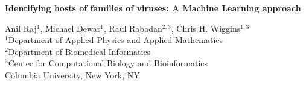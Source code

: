 \documentclass[11pt,amsmath,amstex]{article}
\begin{document}
\begin{center}
\pagestyle{empty}
\textbf{Identifying hosts of families of viruses: A Machine Learning approach}

\small{
Anil Raj$^{1}$, Michael Dewar$^{1}$, Raul Rabadan$^{2,3}$, Chris H. Wiggins$^{1,3}$\\
$^{1}$Department of Applied Physics and Applied Mathematics\\
$^{2}$Department of Biomedical Informatics\\
$^{3}$Center for Computational Biology and Bioinformatics\\
Columbia University, New York, NY\\
}
\end{center}





\end{document}
